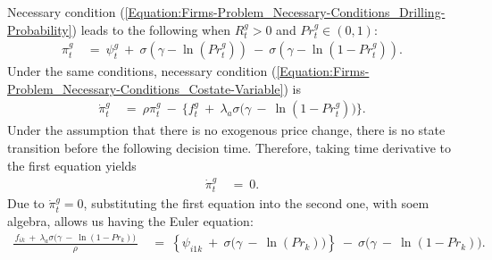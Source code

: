 Necessary condition (\ref{Equation:Firms-Problem_Necessary-Conditions_Drilling-Probability}) leads to the following when $R_{t}^{g} > 0$ and $Pr_{t}^{g} \in (0, 1)$:
\begin{equation*}
\begin{split}
    \pi_{t}^{g} \
    & = \ \psi_{t}^{g} \ + \ \sigma (\gamma - \ln(Pr_{t}^{g})) \ - \ \sigma (\gamma - \ln(1 - Pr_{t}^{g})).
\end{split}
\end{equation*}
Under the same conditions, necessary condition (\ref{Equation:Firms-Problem_Necessary-Conditions_Costate-Variable}) is
\begin{equation*}
\begin{split}
    \dot{\pi}_{t}^{g} \ 
    & = \ \rho \pi_{t}^{g} \ - \ \big\{ f_{t}^{g} \ + \ \lambda_{a} \sigma \big( \gamma \ - \ \ln(1 - Pr_{t}^{g}) \big) \big\}.
\end{split}
\end{equation*}
Under the assumption that there is no exogenous price change, there is no state transition before the following decision time. Therefore, taking time derivative to the first equation yields
\begin{equation*}
\begin{split}
    \dot{\pi}_{t}^{g} \ 
    & = \ 0.
\end{split}
\end{equation*}
Due to $\dot{\pi}_{t}^{g} = 0$, substituting the first equation into the second one, with soem algebra, allows us having the Euler equation:
\begin{equation*}
\begin{split}
    \frac{ \ f_{ik} \ + \ \lambda_{a} \sigma \big( \gamma \ - \ \ln(1 - Pr_{k}) \big) \ }{\rho} \
    & = \ \left\{ \psi_{i1k} \ + \ \sigma \big( \gamma \ - \ \ln(Pr_{k}) \big) \right\} \ - \ \sigma \big( \gamma \ - \ \ln(1 - Pr_{k}) \big).
\end{split}
\end{equation*}